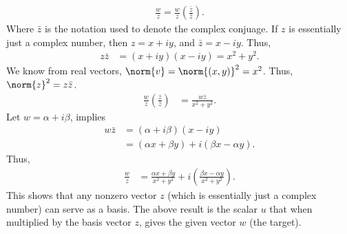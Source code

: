 \documentclass{report}
\begin{document}
\begin{itemize}
            \begin{align*}
                \frac{w}{z} = \frac{w}{z}\left(\frac{\bar{z}}{\bar{z}}\right)
            .\end{align*}
            Where $\bar{z}$ is the notation used to denote the complex conjuage. If $z$ is essentially just a complex number, then $z= x + iy$, and $\bar{z} = x - iy$. Thus, 
            \begin{align*}
                z\bar{z} &= (x+iy)(x-iy) = x^{2} + y^{2}
            .\end{align*}
            We know from real vectors, $\norm{v} = \norm{(x,y)}^{2}  = x^{2}$. Thus, $\norm{z}^{2} = z\bar{z}$. 
            \begin{align*}
                \frac{w}{z}\left(\frac{\bar{z}}{\bar{z}}\right) &= \frac{w\bar{z}}{x^{2}+y^{2}}
            .\end{align*}
            Let $w = \alpha + i \beta$, implies
            \begin{align*}
                w\bar{z} &= (\alpha + i \beta)(x-iy)  \\
                         &= (\alpha x + \beta y) + i (\beta x - \alpha y)
            .\end{align*}
            Thus,
            \begin{align*}
                \frac{w}{z} &= \frac{\alpha x + \beta y}{x^{2} + y^{2}} + i \left(\frac{\beta x - \alpha y}{x^{2} + y^{2}}\right)
            .\end{align*}
            \bigbreak \noindent 
            This shows that any nonzero vector $z$ (which is essentially just a complex number) can serve as a basis. The above result is the scalar $u$ that when multiplied by the basis vector $z$, gives the given vector $w$ (the target).


\end{itemize}
\end{document}
